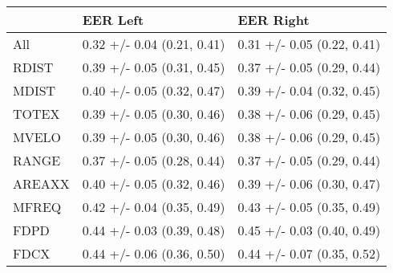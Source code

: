 \begin{tabular}{lll}
\toprule
{} &                    EER Left &                   EER Right \\
\midrule
All    &  0.32 +/- 0.04 (0.21, 0.41) &  0.31 +/- 0.05 (0.22, 0.41) \\
RDIST  &  0.39 +/- 0.05 (0.31, 0.45) &  0.37 +/- 0.05 (0.29, 0.44) \\
MDIST  &  0.40 +/- 0.05 (0.32, 0.47) &  0.39 +/- 0.04 (0.32, 0.45) \\
TOTEX  &  0.39 +/- 0.05 (0.30, 0.46) &  0.38 +/- 0.06 (0.29, 0.45) \\
MVELO  &  0.39 +/- 0.05 (0.30, 0.46) &  0.38 +/- 0.06 (0.29, 0.45) \\
RANGE  &  0.37 +/- 0.05 (0.28, 0.44) &  0.37 +/- 0.05 (0.29, 0.44) \\
AREAXX &  0.40 +/- 0.05 (0.32, 0.46) &  0.39 +/- 0.06 (0.30, 0.47) \\
MFREQ  &  0.42 +/- 0.04 (0.35, 0.49) &  0.43 +/- 0.05 (0.35, 0.49) \\
FDPD   &  0.44 +/- 0.03 (0.39, 0.48) &  0.45 +/- 0.03 (0.40, 0.49) \\
FDCX   &  0.44 +/- 0.06 (0.36, 0.50) &  0.44 +/- 0.07 (0.35, 0.52) \\
\bottomrule
\end{tabular}
